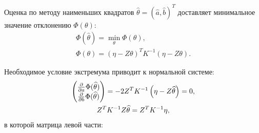 Оценка по методу наименьших квадратов $\widehat{\theta} = \left ( \widehat{a}, \widehat{b} \right )^T$ доставляет минимальное значение отклонению $\Phi(\theta)$:
\begin{gather}
    \Phi(\widehat{\theta}) = \min_\theta \Phi(\theta) , \\
    \Phi(\theta) = \left ( \eta - Z \theta \right )^T K^{-1} \left ( \eta - Z \theta \right ) .
\end{gather}

Необходимое условие экстремума приводит к нормальной системе:
\begin{gather}
    \begin{pmatrix}
        \frac{\partial}{\partial a} \Phi(\widehat{\theta}) \\
        \frac{\partial}{\partial b} \Phi(\widehat{\theta})
    \end{pmatrix}
    = - 2 Z^T K^{-1}
    \left ( \eta - Z \widehat{\theta} \right )
    = 0 , \\
    Z^T K^{-1} Z \widehat{\theta} = Z^T K^{-1} \eta \label{4:normal_system}
    ,
\end{gather}
в которой матрица левой части:
